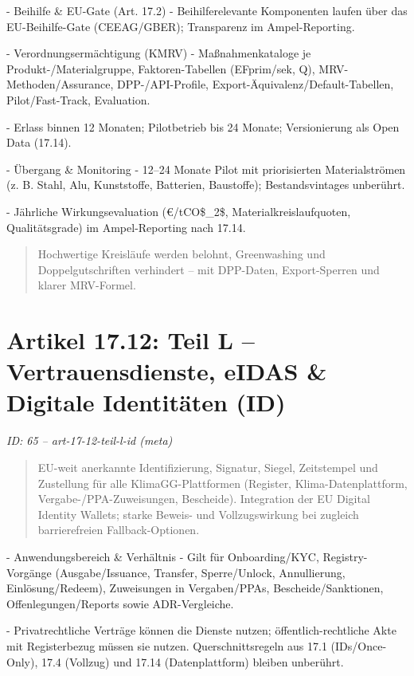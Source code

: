 \documentclass[12pt,a4paper]{scrartcl}
\begin{document}
- Beihilfe \& EU-Gate (Art. 17.2)
- Beihilferelevante Komponenten laufen über das EU-Beihilfe-Gate (CEEAG/GBER); Transparenz im Ampel-Reporting.

- Verordnungsermächtigung (KMRV)
- Maßnahmenkataloge je Produkt-/Materialgruppe, Faktoren-Tabellen (EFprim/sek, Q), MRV-Methoden/Assurance, DPP-/API-Profile, Export-Äquivalenz/Default-Tabellen, Pilot/Fast-Track, Evaluation.

- Erlass binnen 12 Monaten; Pilotbetrieb bis 24 Monate; Versionierung als Open Data (17.14).

- Übergang \& Monitoring
- 12--24 Monate Pilot mit priorisierten Materialströmen (z. B. Stahl, Alu, Kunststoffe, Batterien, Baustoffe); Bestandsvintages unberührt.

- Jährliche Wirkungsevaluation (€/tCO\$\_2\$, Materialkreislaufquoten, Qualitätsgrade) im Ampel-Reporting nach 17.14.

{\footnotesize\begin{quote}
Hochwertige Kreisläufe werden belohnt, Greenwashing und Doppelgutschriften verhindert -- mit DPP-Daten, Export-Sperren und klarer MRV-Formel.
\end{quote}}



\section[Artikel 17.12: Teil L -- Vertrauensdienste, eIDAS \& Digitale Identitäten (ID)]{Artikel 17.12: Teil L -- Vertrauensdienste, eIDAS \& Digitale Identitäten (ID)}
\noindent\textit{ID: 65 -- art-17-12-teil-l-id (meta)}

\begin{quote}
EU-weit anerkannte Identifizierung, Signatur, Siegel, Zeitstempel und Zustellung für alle KlimaGG-Plattformen (Register, Klima-Datenplattform, Vergabe-/PPA-Zuweisungen, Bescheide). Integration der EU Digital Identity Wallets; starke Beweis- und Vollzugswirkung bei zugleich barrierefreien Fallback-Optionen.
\end{quote}

- Anwendungsbereich \& Verhältnis
- Gilt für Onboarding/KYC, Registry-Vorgänge (Ausgabe/Issuance, Transfer, Sperre/Unlock, Annullierung, Einlösung/Redeem), Zuweisungen in Vergaben/PPAs, Bescheide/Sanktionen, Offenlegungen/Reports sowie ADR-Vergleiche.

- Privatrechtliche Verträge können die Dienste nutzen; öffentlich-rechtliche Akte mit Registerbezug müssen sie nutzen. Querschnittsregeln aus 17.1 (IDs/Once-Only), 17.4 (Vollzug) und 17.14 (Datenplattform) bleiben unberührt.
\end{document}
